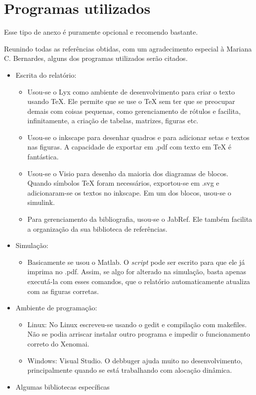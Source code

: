 


\chapter{Programas utilizados}

Esse tipo de anexo é puramente opcional e recomendo bastante.

\label{AnFRHINO} 

Reunindo todas as referências obtidas, com um agradecimento especial
à Mariana C. Bernardes, alguns dos programas utilizados serão citados.
\begin{itemize}
\item Escrita do relatório:

\begin{itemize}
\item Usou-se o Lyx como ambiente de desenvolvimento para criar o texto
usando \TeX{}. Ele permite que se use o \TeX{} sem ter que se preocupar
demais com coisas pequenas, como gerenciamento de rótulos e facilita,
infinitamente, a criação de tabelas, matrizes, figuras etc.
\item Usou-se o inkscape para desenhar quadros e para adicionar setas e
textos nas figuras. A capacidade de exportar em .pdf com texto em
\TeX{} é fantástica.
\item Usou-se o Visio para desenho da maioria dos diagramas de blocos. Quando
símbolos \TeX{} foram necessários, exportou-se em .svg e adicionaram-se
os textos no inkscape. Em um dos blocos, usou-se o simulink.
\item Para gerenciamento da bibliografia, usou-se o JabRef. Ele também facilita
a organização da sua biblioteca de referências.
\end{itemize}
\item Simulação:

\begin{itemize}
\item Basicamente se usou o Matlab. O \textit{script }pode ser escrito para
que ele já imprima no .pdf. Assim, se algo for alterado na simulação,
basta apenas executá-la com esses comandos, que o relatório automaticamente
atualiza com as figuras corretas.
\end{itemize}
\item Ambiente de programação:

\begin{itemize}
\item Linux: No Linux escreveu-se usando o gedit e compilação com makefiles.
Não se podia arriscar instalar outro programa e impedir o funcionamento
correto do Xenomai.
\item Windows: Visual Studio. O debbuger ajuda muito no desenvolvimento,
principalmente quando se está trabalhando com alocação dinâmica.
\end{itemize}
\item Algumas bibliotecas específicas


\end{itemize}
